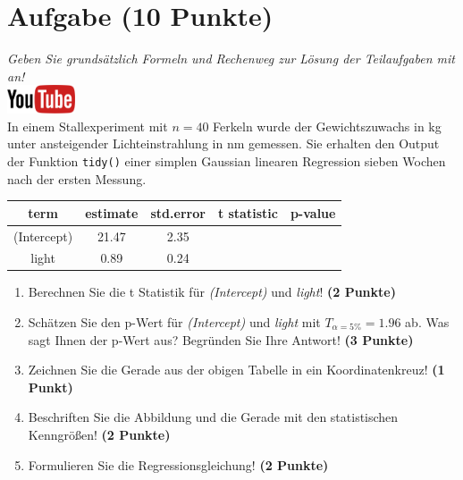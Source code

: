 \documentclass[a4paper, 10pt]{scrartcl}\usepackage[]{graphicx}\usepackage[]{xcolor}
\begin{document}
\section{Aufgabe \hfill (10 Punkte)}

\textit{Geben Sie grunds{\"a}tzlich Formeln und Rechenweg zur L{\"o}sung der
  Teilaufgaben mit an!} \\[1Ex]

\hfill\href{https://youtu.be/lJp8rFmMnrs}{\includegraphics[width =
  2cm]{img/youtube}}\\[1Ex]



In einem Stallexperiment mit $n = 40$ Ferkeln wurde der
Gewichtszuwachs in kg unter ansteigender Lichteinstrahlung in nm
gemessen. Sie erhalten den \Rlogo Output der Funktion \texttt{tidy()} einer
simplen Gaussian linearen Regression sieben Wochen nach der ersten Messung.

\begin{table}[!h]
\centering\begingroup\fontsize{14}{16}\selectfont

\begin{tabular}{ccccc}
\toprule
term & estimate & std.error & t statistic & p-value\\
\midrule
(Intercept) & 21.47 & 2.35 &  & \\
light & 0.89 & 0.24 &  & \\
\bottomrule
\end{tabular}
\endgroup{}
\end{table}



\begin{enumerate}
\item Berechnen Sie die t Statistik f{\"u}r \textit{(Intercept)} und
  \textit{light}! \textbf{(2 Punkte)}
\item Sch{\"a}tzen Sie den p-Wert f{\"u}r \textit{(Intercept)} und
  \textit{light} mit $T_{\alpha = 5\%} = 1.96$ ab. Was sagt Ihnen der p-Wert aus?
  Begr{\"u}nden Sie Ihre Antwort! \textbf{(3 Punkte)}
\item Zeichnen Sie die Gerade aus der obigen Tabelle in ein Koordinatenkreuz! \textbf{(1 Punkt)}
\item Beschriften Sie die Abbildung und die Gerade mit den statistischen
  Kenngr{\"o}{\ss}en! \textbf{(2 Punkte)}
\item Formulieren Sie die Regressionsgleichung! \textbf{(2 Punkte)}
\end{enumerate} 
\clearpage
\end{document}
